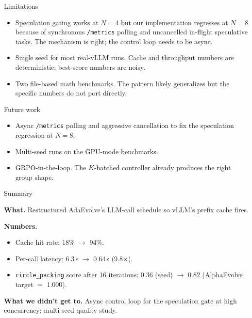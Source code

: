\documentclass[10pt,aspectratio=169]{beamer}
\begin{document}
\begin{frame}{Limitations}

\begin{itemize}\setlength\itemsep{0.5em}
  \item Speculation gating works at $N{=}4$ but our implementation
    regresses at $N{=}8$ because of synchronous \texttt{/metrics}
    polling and uncancelled in-flight speculative tasks. The
    mechanism is right; the control loop needs to be async.
  \item Single seed for most real-vLLM runs. Cache and throughput
    numbers are deterministic; best-score numbers are noisy.
  \item Two file-based math benchmarks. The pattern likely
    generalizes but the specific numbers do not port directly.
\end{itemize}

\end{frame}

\begin{frame}{Future work}

\begin{itemize}\setlength\itemsep{0.5em}
  \item Async \texttt{/metrics} polling and aggressive cancellation
    to fix the speculation regression at $N{=}8$.
  \item Multi-seed runs on the GPU-mode benchmarks.
  \item GRPO-in-the-loop. The $K$-batched controller already
    produces the right group shape.
\end{itemize}

\end{frame}

\begin{frame}{Summary}

\textbf{What.} Restructured AdaEvolve's LLM-call schedule so vLLM's
prefix cache fires.

\vspace{0.5em}
\textbf{Numbers.}
\begin{itemize}\setlength\itemsep{0.2em}
  \item Cache hit rate: 18\% $\to$ 94\%.
  \item Per-call latency: 6.3\,s $\to$ 0.64\,s (9.8$\times$).
  \item \texttt{circle\_packing} score after 16 iterations:
    0.36 (seed) $\to$ 0.82 (AlphaEvolve target $=$ 1.000).
\end{itemize}

\vspace{0.5em}
\textbf{What we didn't get to.} Async control loop for the
speculation gate at high concurrency; multi-seed quality study.

\end{frame}
\end{document}
